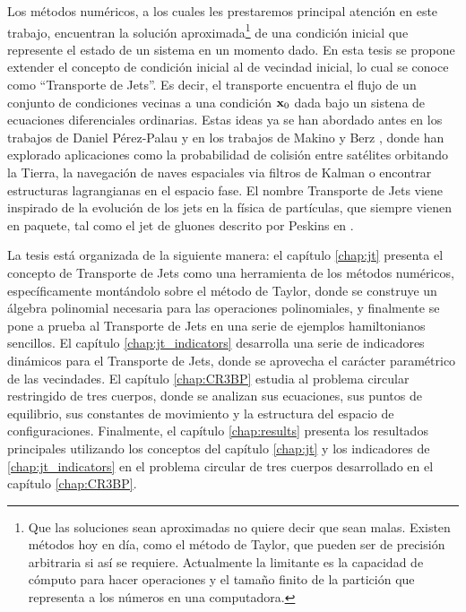 Los métodos numéricos, a los cuales les prestaremos principal atención en este trabajo, encuentran la solución aproximada\footnote{Que las soluciones sean aproximadas no quiere decir que sean malas. Existen métodos hoy en día, como el método de Taylor, que pueden ser de precisión arbitraria si así se requiere. Actualmente la limitante es la capacidad de cómputo para hacer operaciones y el tamaño finito de la partición que representa a los números en una computadora.} de una condición inicial que represente el estado de un sistema en un momento dado. En esta tesis se propone extender el concepto de condición inicial al de vecindad inicial, lo cual se conoce como ``Transporte de Jets''. Es decir, el transporte encuentra el flujo de un conjunto de condiciones vecinas a una condición $\mathbf{x}_0$ dada bajo un sistena de ecuaciones diferenciales ordinarias. Estas ideas ya se han abordado antes en los trabajos de Daniel Pérez-Palau \cite{Daniel2015, Perez2013, Perez2015} y en los trabajos de Makino y Berz \cite{Berz1991,Berz1998}, donde han explorado aplicaciones como la probabilidad de colisión entre satélites orbitando la Tierra, la navegación de naves espaciales via filtros de Kalman o  encontrar estructuras lagrangianas en el espacio fase. El nombre Transporte de Jets viene inspirado de la evolución de los jets en la física de partículas, que siempre vienen en paquete, tal como el jet de gluones descrito por Peskins en \cite{Peskin1996}.

La tesis está organizada de la siguiente manera: el capítulo \ref{chap:jt} presenta el concepto de Transporte de Jets como una herramienta de los métodos numéricos, específicamente montándolo sobre el método de Taylor, donde se construye un álgebra polinomial necesaria para las operaciones polinomiales, y finalmente se pone a prueba al Transporte de Jets en una serie de ejemplos hamiltonianos sencillos. El capítulo \ref{chap:jt_indicators} desarrolla una serie de indicadores dinámicos para el Transporte de Jets, donde se aprovecha el carácter paramétrico de las vecindades. El capítulo \ref{chap:CR3BP} estudia al problema circular restringido de tres cuerpos, donde se analizan sus ecuaciones, sus puntos de equilibrio, sus constantes de movimiento y la estructura del espacio de configuraciones. Finalmente, el capítulo \ref{chap:results} presenta los resultados principales utilizando los conceptos del capítulo \ref{chap:jt} y los indicadores de \ref{chap:jt_indicators} en el problema circular de tres cuerpos desarrollado en el capítulo \ref{chap:CR3BP}. 



